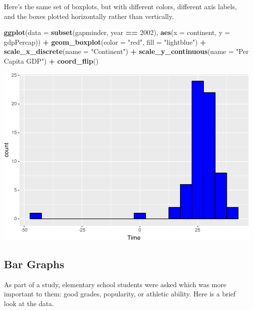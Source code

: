 \documentclass[]{krantz}
\makeatletter
\newenvironment{Shaded}{\begin{snugshade}}{\end{snugshade}}
\newcommand{\DataTypeTok}[1]{\textcolor[rgb]{0.27,0.27,0.27}{#1}}
\newcommand{\DecValTok}[1]{\textcolor[rgb]{0.06,0.06,0.06}{#1}}
\newcommand{\KeywordTok}[1]{\textcolor[rgb]{0.27,0.27,0.27}{\textbf{#1}}}
\newcommand{\NormalTok}[1]{#1}
\newcommand{\OperatorTok}[1]{\textcolor[rgb]{0.43,0.43,0.43}{\textbf{#1}}}
\newcommand{\StringTok}[1]{\textcolor[rgb]{0.5,0.5,0.5}{#1}}
\newenvironment{kframe}{%
\medskip{}
\setlength{\fboxsep}{.8em}
 \def\at@end@of@kframe{}%
 \ifinner\ifhmode%
  \def\at@end@of@kframe{\end{minipage}}%
  \begin{minipage}{\columnwidth}%
 \fi\fi%
 \def\FrameCommand##1{\hskip\@totalleftmargin \hskip-\fboxsep
 \colorbox{shadecolor}{##1}\hskip-\fboxsep
     \hskip-\linewidth \hskip-\@totalleftmargin \hskip\columnwidth}%
 \MakeFramed {\advance\hsize-\width
   \@totalleftmargin\z@ \linewidth\hsize
   \@setminipage}}%
 {\par\unskip\endMakeFramed%
 \at@end@of@kframe}
\renewenvironment{Shaded}{\begin{kframe}}{\end{kframe}}
\makeatother
\begin{document}
Here's the same set of boxplots, but with different colors, different axis labels, and the boxes plotted horizontally rather than vertically.

\begin{Shaded}
\begin{Highlighting}[]
\KeywordTok{ggplot}\NormalTok{(}\DataTypeTok{data =} \KeywordTok{subset}\NormalTok{(gapminder,  year }\OperatorTok{==}\StringTok{ }\DecValTok{2002}\NormalTok{), }
       \KeywordTok{aes}\NormalTok{(}\DataTypeTok{x =}\NormalTok{ continent, }\DataTypeTok{y =}\NormalTok{ gdpPercap)) }\OperatorTok{+}\StringTok{ }
\StringTok{    }\KeywordTok{geom_boxplot}\NormalTok{(}\DataTypeTok{color =} \StringTok{"red"}\NormalTok{, }\DataTypeTok{fill =} \StringTok{"lightblue"}\NormalTok{) }\OperatorTok{+}\StringTok{ }
\StringTok{    }\KeywordTok{scale_x_discrete}\NormalTok{(}\DataTypeTok{name =} \StringTok{"Continent"}\NormalTok{) }\OperatorTok{+}\StringTok{ }
\StringTok{    }\KeywordTok{scale_y_continuous}\NormalTok{(}\DataTypeTok{name =} \StringTok{"Per Capita GDP"}\NormalTok{) }\OperatorTok{+}\StringTok{ }\KeywordTok{coord_flip}\NormalTok{()}
\end{Highlighting}
\end{Shaded}

\includegraphics{bookdown_files/figure-latex/unnamed-chunk-76-1.pdf}

\hypertarget{bar-graphs}{%
\subsection{Bar Graphs}\label{bar-graphs}}

As part of a study, elementary school students were asked which was more important to them: good grades, popularity, or athletic ability. Here is a brief look at the data.
\end{document}
